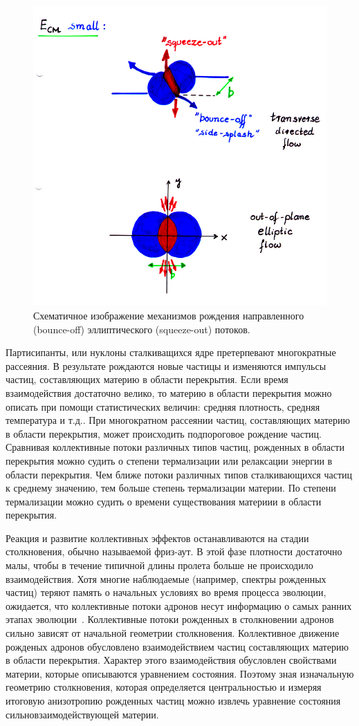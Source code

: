 \begin{figure}[ht]
\begin{center}
    \includegraphics[width=0.75\linewidth]{images/bounce_off.jpg}
    \caption{Схематичное изображение механизмов рождения направленного (bounce-off) эллиптического (squeeze-out) потоков.}
    \label{fig:bounce_off}
\end{center}
\end{figure}
%

Партисипанты, или нуклоны сталкиващихся ядре претерпевают многократные рассеяния.
В результате рождаются новые частицы и изменяются импульсы частиц, составляющих материю в области перекрытия.
Если время взаимодействия достаточно велико, то материю в области перекрытия можно описать при помощи статистических величин: средняя плотность, средняя температура и т.д..
При многократном рассеянии частиц, составляющих материю в области перекрытия, может происходить подпороговое рождение частиц.
Сравнивая коллективные потоки различных типов частиц, рожденных в области перекрытия можно судить о степени термализации или релаксации энергии в области перекрытия.
Чем ближе потоки различных типов сталкивающихся частиц к среднему значению, тем больше степень термализации материи.
По степени термализации можно судить о времени существования материии в области перекрытия.  

Реакция и развитие коллективных эффектов останавливаются на стадии столкновения, обычно называемой фриз-аут. 
В этой фазе плотности достаточно малы, чтобы в течение типичной длины пролета больше не происходило взаимодействия.
Хотя многие наблюдаемые (например, спектры рожденных частиц) теряют память о начальных условиях во время процесса эволюции, ожидается, что коллективные потоки адронов несут информацию о самых ранних этапах эволюции~\cite{Herrmann:1999wu}.
Коллективные потоки рожденных в столкновении адронов сильно зависят от начальной геометрии столкновения.
Коллективное движение рожденых адронов обусловлено взаимодействием частиц составляющих материю в области перекрытия.
Характер этого взаимодействия обусловлен свойствами материи, которые описываются уравнением состояния.
Поэтому зная изначальную геометрию столкновения, которая определяется центральностью и измеряя итоговую анизотропию рожденных частиц можно извлечь уравнение состояния сильновзаимодействующей материи.

